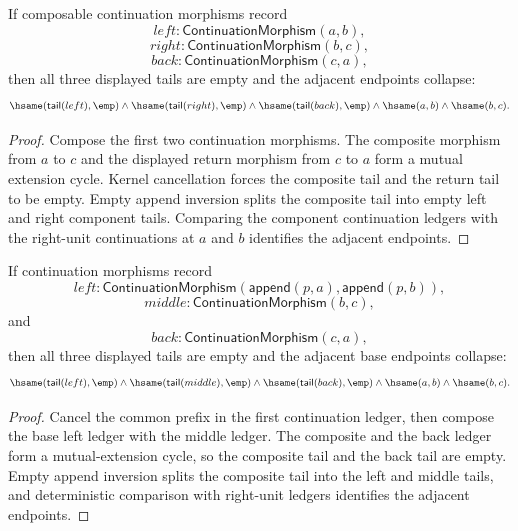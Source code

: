 \begin{theorem}
\label{thm:category-continuation-morphism-triangle-cycle-tails-empty}
If composable continuation morphisms record
$$
left:\mathsf{ContinuationMorphism}(a,b),
$$
$$
right:\mathsf{ContinuationMorphism}(b,c),
$$
$$
back:\mathsf{ContinuationMorphism}(c,a),
$$
then all three displayed tails are empty and the adjacent endpoints collapse:
$$
\hsame(\mathsf{tail}(left),\emp)\land
\hsame(\mathsf{tail}(right),\emp)\land
\hsame(\mathsf{tail}(back),\emp)\land
\hsame(a,b)\land\hsame(b,c).
$$
\end{theorem}
\begin{proof}
Compose the first two continuation morphisms. The composite morphism from $a$
to $c$ and the displayed return morphism from $c$ to $a$ form a mutual
extension cycle. Kernel cancellation forces the composite tail and the return
tail to be empty. Empty append inversion splits the composite tail into empty
left and right component tails. Comparing the component continuation ledgers
with the right-unit continuations at $a$ and $b$ identifies the adjacent
endpoints.
\end{proof}

\begin{theorem}
\label{thm:continuation-morphism-prefix-triangle-cycle-tails-empty}
If continuation morphisms record
$$
left:\mathsf{ContinuationMorphism}(\mathsf{append}(p,a),\mathsf{append}(p,b)),
$$
$$
middle:\mathsf{ContinuationMorphism}(b,c),
$$
and
$$
back:\mathsf{ContinuationMorphism}(c,a),
$$
then all three displayed tails are empty and the adjacent base endpoints
collapse:
$$
\hsame(\mathsf{tail}(left),\emp)\land
\hsame(\mathsf{tail}(middle),\emp)\land
\hsame(\mathsf{tail}(back),\emp)\land
\hsame(a,b)\land\hsame(b,c).
$$
\end{theorem}
\begin{proof}
Cancel the common prefix in the first continuation ledger, then compose the
base left ledger with the middle ledger. The composite and the back ledger form
a mutual-extension cycle, so the composite tail and the back tail are empty.
Empty append inversion splits the composite tail into the left and middle
tails, and deterministic comparison with right-unit ledgers identifies the
adjacent endpoints.
\end{proof}

